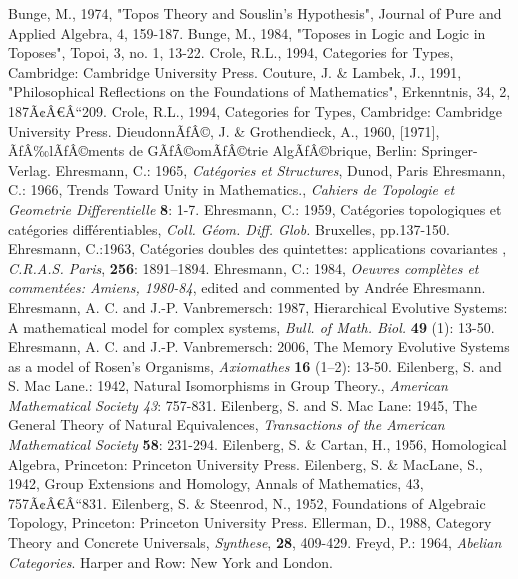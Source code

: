 \documentclass[12pt]{article}
\begin{document}
\begin{thebibliography}{199}
Bunge, M., 1974, "Topos Theory and Souslin's Hypothesis", Journal of Pure and Applied Algebra, 4, 159-187.  
Bunge, M., 1984, "Toposes in Logic and Logic in Toposes", Topoi, 3, no. 1, 13-22. 
Crole, R.L., 1994, Categories for Types, Cambridge: Cambridge University Press.  
Couture, J. \& Lambek, J., 1991, "Philosophical Reflections on the Foundations of Mathematics", Erkenntnis, 34, 2, 187Ã¢Â€Â“209. 
Crole, R.L., 1994, Categories for Types, Cambridge: Cambridge University Press.  
DieudonnÃƒÂ©, J. \& Grothendieck, A., 1960, [1971], ÃƒÂ‰lÃƒÂ©ments de GÃƒÂ©omÃƒÂ©trie AlgÃƒÂ©brique, Berlin: Springer-Verlag.  
Ehresmann, C.: 1965, \emph{Cat\'egories et Structures}, Dunod,
Paris
Ehresmann, C.: 1966, Trends Toward Unity in Mathematics.,
\emph{Cahiers de Topologie et Geometrie Differentielle}
\textbf{8}: 1-7.
Ehresmann, C.: 1959, Cat\'egories topologiques et cat\'egories
diff\'erentiables, \emph{Coll. G\'eom. Diff. Glob.} Bruxelles, pp.137-150.
Ehresmann, C.:1963, Cat\'egories doubles des quintettes: applications covariantes
, \emph{C.R.A.S. Paris}, \textbf{256}: 1891--1894.
Ehresmann, C.: 1984, \emph{Oeuvres compl\`etes et  comment\'ees:
Amiens, 1980-84}, edited and commented by Andr\'ee Ehresmann.
Ehresmann, A. C. and J.-P. Vanbremersch: 1987, Hierarchical
Evolutive Systems: A mathematical model for complex systems,
\emph{Bull. of Math. Biol.} \textbf{49} (1): 13-50.
Ehresmann, A. C. and J.-P. Vanbremersch: 2006, The Memory Evolutive Systems as
a model of Rosen's Organisms, \emph{Axiomathes} \textbf{16} (1--2): 13-50.
Eilenberg, S. and S. Mac Lane.: 1942, Natural Isomorphisms in Group Theory., \emph{American Mathematical Society 43}: 757-831.
Eilenberg, S. and S. Mac Lane: 1945, The General Theory of Natural Equivalences, \emph{Transactions of the American Mathematical Society} \textbf{58}: 231-294.
Eilenberg, S. \& Cartan, H., 1956, Homological Algebra, Princeton: Princeton University Press. 
Eilenberg, S. \& MacLane, S., 1942, Group Extensions and Homology, Annals of Mathematics, 43, 757Ã¢Â€Â“831. 
Eilenberg, S. \& Steenrod, N., 1952, Foundations of Algebraic Topology, Princeton: Princeton University Press. 
Ellerman, D., 1988, Category Theory and Concrete Universals, {\em Synthese}, \textbf{28}, 409-429. 
Freyd, P.: 1964, \emph{Abelian Categories}. Harper and Row: New York and London.

\end{thebibliography}
\end{document}
